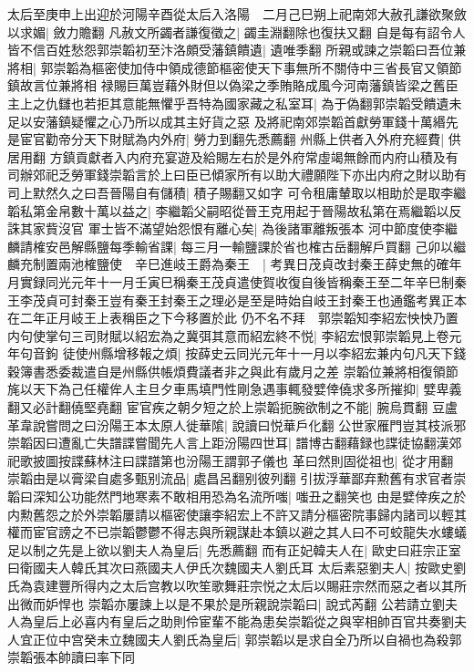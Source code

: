 太后至庚申上出迎於河陽辛酉從太后入洛陽　二月己巳朔上祀南郊大赦孔謙欲聚斂以求媚|{
	斂力贍翻}
凡赦文所蠲者謙復徵之|{
	蠲圭淵翻除也復扶又翻}
自是每有詔令人皆不信百姓愁怨郭崇韜初至汴洛頗受藩鎮饋遺|{
	遺唯季翻}
所親或諫之崇韜曰吾位兼將相|{
	郭崇韜為樞密使加侍中領成德節樞密使天下事無所不關侍中三省長官又領節鎮故言位兼將相}
禄賜巨萬豈藉外財但以偽梁之季賄賂成風今河南藩鎮皆梁之舊臣主上之仇讎也若拒其意能無懼乎吾特為國家藏之私室耳|{
	為于偽翻郭崇韜受饋遺未足以安藩鎮疑懼之心乃所以成其主好貨之惡}
及將祀南郊崇韜首獻勞軍錢十萬緡先是宦官勸帝分天下財賦為内外府|{
	勞力到翻先悉薦翻}
州縣上供者入外府充經費|{
	供居用翻}
方鎮貢獻者入内府充宴遊及給賜左右於是外府常虛竭無餘而内府山積及有司辦郊祀乏勞軍錢崇韜言於上曰臣已傾家所有以助大禮願陛下亦出内府之財以助有司上默然久之曰吾晉陽自有儲積|{
	積子賜翻又如字}
可令租庸輦取以相助於是取李繼韜私第金帛數十萬以益之|{
	李繼韜父嗣昭從晉王克用起于晉陽故私第在焉繼韜以反誅其家貲沒官}
軍士皆不滿望始怨恨有離心矣|{
	為後諸軍離叛張本}
河中節度使李繼麟請榷安邑解縣鹽每季輸省課|{
	每三月一輸鹽課於省也榷古岳翻解戶買翻}
己卯以繼麟充制置兩池榷鹽使　辛巳進岐王爵為秦王　|{
	考異日茂貞改封秦王薛史無的確年月實録同光元年十一月壬寅巳稱秦王茂貞遣使賀收復自後皆稱秦王至二年辛巳制秦王李茂貞可封秦王豈有秦王封秦王之理必是至是時始自岐王封秦王也通鑑考異正本在二年正月岐王上表稱臣之下今移置於此}
仍不名不拜　郭崇韜知李紹宏怏怏乃置内句使掌句三司財賦以紹宏為之冀弭其意而紹宏終不悦|{
	李紹宏恨郭崇韜見上卷元年句音鉤}
徒使州縣增移報之煩|{
	按薛史云同光元年十一月以李紹宏兼内句凡天下錢穀簿書悉委裁遣自是州縣供帳煩費議者非之與此有歲月之差}
崇韜位兼將相復領節旄以天下為己任權侔人主旦夕車馬填門性剛急遇事輒發嬖倖僥求多所摧抑|{
	嬖卑義翻又必計翻僥堅堯翻}
宦官疾之朝夕短之於上崇韜扼腕欲制之不能|{
	腕烏貫翻}
豆盧革韋說嘗問之曰汾陽王本太原人徙華隂|{
	說讀曰悦華戶化翻}
公世家雁門豈其枝派邪崇韜因曰遭亂亡失譜諜嘗聞先人言上距汾陽四世耳|{
	譜博古翻藉録也諜徒協翻漢郊祀歌披圖按諜蘇林注曰諜譜第也汾陽王謂郭子儀也}
革曰然則固從祖也|{
	從才用翻}
崇韜由是以膏梁自處多甄别流品|{
	處昌呂翻别彼列翻}
引拔浮華鄙弃勲舊有求官者崇韜曰深知公功能然門地寒素不敢相用恐為名流所嗤|{
	嗤丑之翻笑也}
由是嬖倖疾之於内勲舊怨之於外崇韜屢請以樞密使讓李紹宏上不許又請分樞密院事歸内諸司以輕其權而宦官謗之不已崇韜鬱鬱不得志與所親謀赴本鎮以避之其人曰不可蛟龍失水螻蟻足以制之先是上欲以劉夫人為皇后|{
	先悉薦翻}
而有正妃韓夫人在|{
	歐史曰莊宗正室曰衛國夫人韓氏其次曰燕國夫人伊氏次魏國夫人劉氏耳}
太后素惡劉夫人|{
	按歐史劉氏為袁建豐所得内之太后宫教以吹笙歌舞莊宗悦之太后以賜莊宗然而惡之者以其所出微而妒悍也}
崇韜亦屢諫上以是不果於是所親說崇韜曰|{
	說式芮翻}
公若請立劉夫人為皇后上必喜内有皇后之助則伶宦輩不能為患矣崇韜從之與宰相帥百官共奏劉夫人宜正位中宫癸未立魏國夫人劉氏為皇后|{
	郭崇韜以是求自全乃所以自禍也為殺郭崇韜張本帥讀曰率下同}

